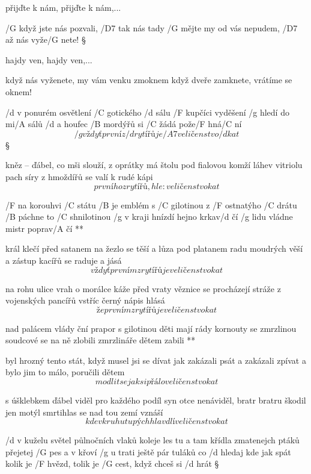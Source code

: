 
přijďte k nám, přijďte k nám,... \s

/G když jste nás pozvali, /D7 tak nás tady /G mějte
my od vás nepudem, /D7 až nás vyže/G nete! \S

hajdy ven, hajdy ven,... \s

když nás vyženete, my vám venku zmoknem
když dveře zamknete, vrátíme se oknem!





/d v ponurém osvětlení /C gotického /d sálu
/F kupčíci vyděšení /g hledí do mi/A sálů
/d a houfec /B mordýřů si /C žádá pože/F hná/C ní
\[ /g vždyť první z /d rytířů je /A7 veličenstvo /d kat \] \S

kněz -- ďábel, co mši slouží, z oprátky má štolu
pod fialovou komží láhev vitriolu
pach síry z hmoždířů se valí k rudé kápi
\[ prvního z rytířů, hle: veličenstvo kat \]

\R  /F na korouhvi /C státu /B je emblém s /C gilotinou
    z /F ostnatýho /C drátu /B páchne to /C shnilotinou
    /g v kraji hnízdí hejno krkav/d čí
    /g lidu vládne mistr poprav/A čí **

král klečí před satanem na žezlo se těší
a lůza pod platanem radu moudrých věší
a zástup kacířů se raduje a jásá
\[ vždyť prvním z rytířů je veličenstvo kat \] \s

na rohu ulice vrah o morálce káže
před vraty věznice se procházejí stráže
z vojenských pancířů vstříc černý nápis hlásá
\[ že prvním z rytířů je veličenstvo kat \]

\R  nad palácem vlády ční prapor s gilotinou
    děti mají rády kornouty se zmrzlinou
    soudcové se na ně zlobili
    zmrzlináře dětem zabili **

byl hrozný tento stát, když musel jsi se dívat
jak zakázali psát a zakázali zpívat
a bylo jim to málo, poručili dětem
\[ modlit se jak si přálo veličenstvo kat \] \s

s úšklebkem ďábel viděl pro každého podíl
syn otce nenáviděl, bratr bratru škodil
jen motýl smrtihlas se nad tou zemí vznáší
\[ kde v kruhu tupých hlav dlí veličenstvo kat \]




/d v kuželu světel půlnočních vlaků koleje les
tu a tam křídla zmatenejch ptáků přejetej /G pes
a v křoví /g u trati ještě pár tuláků co /d hledaj kde jak spát
kolik je /F hvězd, tolik je /G cest, když chceš si /d hrát \S

